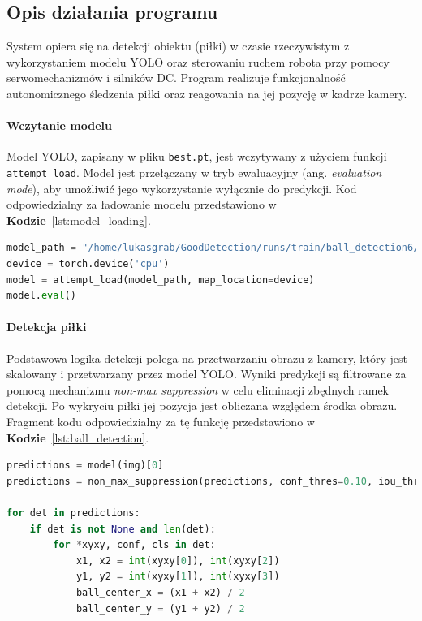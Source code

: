 \documentclass[a4paper,twoside,12pt]{book}
\begin{document}
\newpage
\subsection{Opis działania programu}

System opiera się na detekcji obiektu (piłki) w czasie rzeczywistym z wykorzystaniem modelu YOLO oraz sterowaniu ruchem robota przy pomocy serwomechanizmów i silników DC. Program realizuje funkcjonalność autonomicznego śledzenia piłki oraz reagowania na jej pozycję w kadrze kamery.

\paragraph{Wczytanie modelu}
Model YOLO, zapisany w pliku \texttt{best.pt}, jest wczytywany z użyciem funkcji \texttt{attempt\_load}. Model jest przełączany w tryb ewaluacyjny (ang. \textit{evaluation mode}), aby umożliwić jego wykorzystanie wyłącznie do predykcji. Kod odpowiedzialny za ładowanie modelu przedstawiono w \textbf{Kodzie}~\ref{lst:model_loading}.

\begin{lstlisting}[language=Python, caption={Ładowanie modelu YOLO do pamięci.}, label={lst:model_loading}, captionpos=b]
model_path = "/home/lukasgrab/GoodDetection/runs/train/ball_detection6/weights/best.pt"
device = torch.device('cpu')
model = attempt_load(model_path, map_location=device)
model.eval()
\end{lstlisting}

\paragraph{Detekcja piłki}
Podstawowa logika detekcji polega na przetwarzaniu obrazu z kamery, który jest skalowany i przetwarzany przez model YOLO. Wyniki predykcji są filtrowane za pomocą mechanizmu \textit{non-max suppression} w celu eliminacji zbędnych ramek detekcji. Po wykryciu piłki jej pozycja jest obliczana względem środka obrazu. Fragment kodu odpowiedzialny za tę funkcję przedstawiono w \textbf{Kodzie}~\ref{lst:ball_detection}.

\begin{lstlisting}[language=Python, caption={Logika detekcji piłki przy użyciu modelu YOLO.}, label={lst:ball_detection}, captionpos=b]
predictions = model(img)[0]
predictions = non_max_suppression(predictions, conf_thres=0.10, iou_thres=0.45)

for det in predictions:
    if det is not None and len(det):
        for *xyxy, conf, cls in det:
            x1, x2 = int(xyxy[0]), int(xyxy[2])
            y1, y2 = int(xyxy[1]), int(xyxy[3])
            ball_center_x = (x1 + x2) / 2
            ball_center_y = (y1 + y2) / 2
\end{lstlisting}
\end{document}
